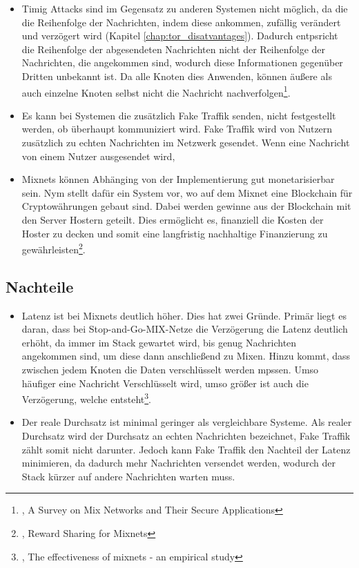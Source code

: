 \begin{itemize}
    \item Timig Attacks sind im Gegensatz zu anderen Systemen nicht möglich, da die die Reihenfolge der Nachrichten, indem diese ankommen, zufällig verändert und verzögert wird (Kapitel \ref{chap:tor_disatvantages}). Dadurch entpsricht die Reihenfolge der abgesendeten Nachrichten nicht der Reihenfolge der Nachrichten, die angekommen sind, wodurch diese Informationen gegenüber Dritten unbekannt ist. Da alle Knoten dies Anwenden, können äußere als auch einzelne Knoten selbst nicht die Nachricht nachverfolgen\footnote{\cite{MixNetworksSecureApplications}, A Survey on Mix Networks and Their Secure Applications}.
    \item Es kann bei Systemen die zusätzlich Fake Traffik senden, nicht festgestellt werden, ob überhaupt kommuniziert wird. Fake Traffik wird von Nutzern zusätzlich zu echten Nachrichten im Netzwerk gesendet. Wenn eine Nachricht von einem Nutzer ausgesendet wird, 
    \item Mixnets können Abhänging von der Implementierung gut monetarisierbar sein. Nym stellt dafür ein System vor, wo auf dem Mixnet eine Blockchain für Cryptowährungen gebaut sind. Dabei werden gewinne aus der Blockchain mit den Server Hostern geteilt. Dies ermöglicht es, finanziell die Kosten der Hoster zu decken und somit eine langfristig nachhaltige Finanzierung zu gewährleisten\footnote{\cite{RewardSharingForMixnets}, Reward Sharing for Mixnets}.
\end{itemize}

\subsection{Nachteile}
\label{chap:mixnet_disadvantages}

\begin{itemize}
    \item Latenz ist bei Mixnets deutlich höher. Dies hat zwei Gründe. Primär liegt es daran, dass bei Stop-and-Go-MIX-Netze die Verzögerung die Latenz deutlich erhöht, da immer im Stack gewartet wird, bis genug Nachrichten angekommen sind, um diese dann anschließend zu Mixen. Hinzu kommt, dass zwischen jedem Knoten die Daten verschlüsselt werden mpssen. Umso häufiger eine Nachricht Verschlüsselt wird, umso größer ist auch die Verzögerung, welche entsteht\footnote{\cite{EffectivenessOfMixnets}, The effectiveness of mixnets - an empirical study}.
    \item Der reale Durchsatz ist minimal geringer als vergleichbare Systeme. Als realer Durchsatz wird der Durchsatz an echten Nachrichten bezeichnet, Fake Traffik zählt somit nicht darunter. Jedoch kann Fake Traffik den Nachteil der Latenz minimieren, da dadurch mehr Nachrichten versendet werden, wodurch der Stack kürzer auf andere Nachrichten warten muss.
\end{itemize}
